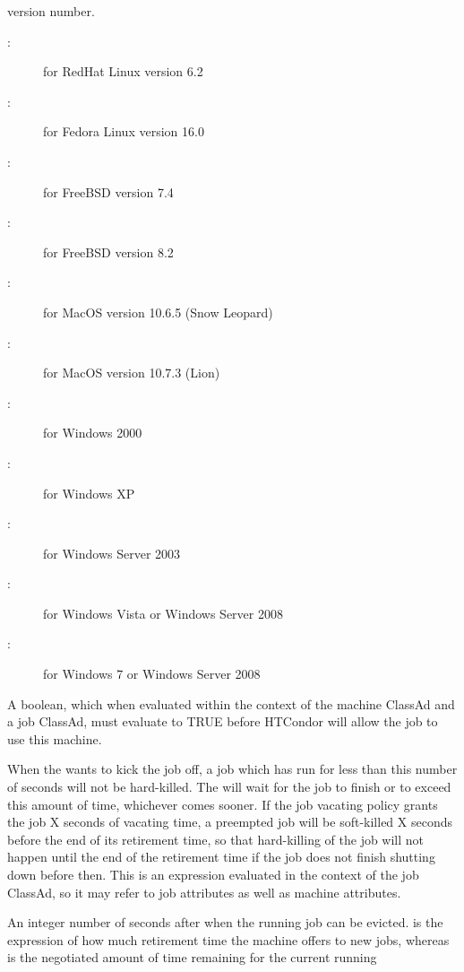 \begin{description}
version number.
	\begin{description}
	\item[:] for RedHat Linux version 6.2
	\item[:] for Fedora Linux version 16.0
	\item[:] for FreeBSD version 7.4
	\item[:] for FreeBSD version 8.2
	\item[:] for MacOS version 10.6.5 (Snow Leopard)
	\item[:] for MacOS version 10.7.3 (Lion)
	\item[:] for Windows 2000
	\item[:] for Windows XP
	\item[:] for Windows Server 2003
	\item[:] for Windows Vista or Windows Server 2008
	\item[:] for Windows 7 or Windows Server 2008
	\end{description}
%
\item[\AdAttr{Requirements}:] A boolean, which when evaluated within the context
of the machine ClassAd and a job ClassAd, must evaluate to
TRUE before HTCondor will allow the job to use this machine.
%
\item[\AdAttr{MaxJobRetirementTime}:] When the  wants
to kick the job off, a job which has run for less than this number
of seconds will not be hard-killed.  The  will wait
for the job to finish or to exceed this amount of time, whichever
comes sooner.  If the job vacating policy grants the job X seconds
of vacating time, a preempted job will be soft-killed X seconds
before the end of its retirement time, so that hard-killing of the
job will not happen until the end of the retirement time if the job
does not finish shutting down before then.  This is an expression
evaluated in the context of the job ClassAd, so it may refer to job
attributes as well as machine attributes.
%
\item[\AdAttr{RetirementTimeRemaining}:] An integer number of seconds
after  when the running job can be evicted.
 is the expression of how much retirement
time the machine offers to new jobs, whereas 
is the negotiated amount of time remaining for the current running

\end{description}

